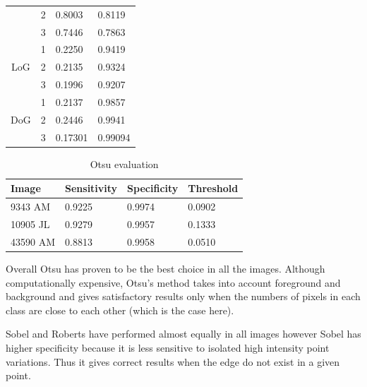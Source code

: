 \documentclass{article}
\begin{document}
\begin{table}[H]
\begin{tabular}{|c|c|l|l|}
                                    & 2                          & 0.8003      & 0.8119      \\ \cline{2-4} 
                                    & 3                          & 0.7446      & 0.7863      \\ \hline
\multirow{3}{*}{LoG}                & 1                          & 0.2250      & 0.9419      \\ \cline{2-4} 
                                    & 2                          & 0.2135      & 0.9324      \\ \cline{2-4} 
                                    & 3                          & 0.1996      & 0.9207      \\ \hline
\multirow{3}{*}{DoG}                & 1                          & 0.2137      & 0.9857      \\ \cline{2-4} 
                                    & 2                          & 0.2446      & 0.9941      \\ \cline{2-4} 
                                    & 3                          & 0.17301     & 0.99094     \\ \hline
\end{tabular}
\end{table}
	
\begin{table}[H]
\centering
\caption{Otsu evaluation}
\label{otsu}
\begin{tabular}{@{}llll@{}}
\toprule
Image    & Sensitivity & Specificity & Threshold \\ \midrule
9343 AM  & 0.9225      & 0.9974      & 0.0902    \\
10905 JL & 0.9279      & 0.9957      & 0.1333    \\
43590 AM & 0.8813      & 0.9958      & 0.0510    \\ \bottomrule
\end{tabular}
\end{table}

Overall Otsu has proven to be the best choice in all the images. Although
computationally expensive, Otsu's method takes into account foreground and
background and gives satisfactory results only when the numbers of pixels in each class are close to each other (which is the case here).

Sobel and Roberts have performed almost equally in all images however Sobel has
higher specificity because it is less sensitive to isolated high intensity point variations. Thus it gives correct results when the edge do not exist in a given point.
\end{document}

